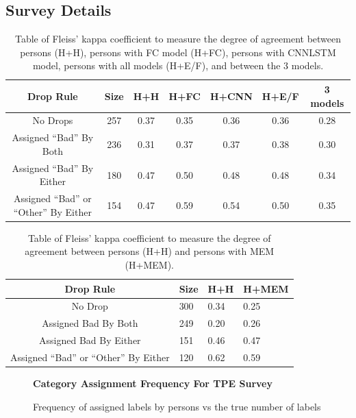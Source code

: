 \documentclass[runningheads,a4paper]{llncs}
\begin{document}
\begin{appendices}
\chapter{Survey Details}
\label{appendix:surveys}
\begin{table}[h!]
  \begin{tabular}{|c | c | c | c | c | c | c|} 
  \hline
  Drop Rule & Size & H+H & H+FC & H+CNN & H+E/F & 3 models \\ [0.5ex] 
  \hline
  No Drops & 257 &0.37 & 0.35 & 0.36 & 0.36 & 0.28\\ 
  \hline
  Assigned \enquote{Bad} By Both & 236 & 0.31 & 0.37 & 0.37 & 0.38 & 0.30 \\
  \hline
  Assigned \enquote{Bad} By Either & 180 & 0.47 & 0.50 & 0.48 & 0.48 &  0.34 \\
  \hline
  Assigned \enquote{Bad} or \enquote{Other} By Either & 154 & 0.47 & 0.59 & 0.54 & 0.50 &  0.35 \\
  \hline
 \end{tabular}
 \caption{\label{kappa_table_TPE}Table of Fleiss' kappa coefficient to measure the degree of agreement between persons (H+H), persons with FC model (H+FC), persons with CNNLSTM model, persons with all models (H+E/F), and between the 3 models. } %
 \end{table}
\begin{table}[h!]
 \begin{tabular}{|c| p{2cm} | p{2cm}| p{2cm}|} 
 \hline
 Drop Rule & Size & H+H & H+MEM \\
 \hline
 No Drop & 300 & 0.34 & 0.25\\ 
 \hline
 Assigned Bad By Both & 249 & 0.20 & 0.26 \\
 \hline
 Assigned Bad By Either & 151 & 0.46 &  0.47 \\
 \hline
Assigned \enquote{Bad} or \enquote{Other} By Either  & 120 & 0.62   &  0.59 \\
 \hline
\end{tabular}
\caption{\label{kappa_table_MEM}Table of Fleiss' kappa coefficient to measure the degree of agreement between persons (H+H) and persons with MEM (H+MEM).}
\end{table}


\begin{figure}[h!]
    \begin{center}
    \textbf{Category Assignment Frequency For TPE Survey}
    \end{center}
    \caption{Frequency of assigned labels by persons vs the true number of labels}
\label{fig:freq-survey-2p}
\end{figure}


\end{appendices}
\end{document}
